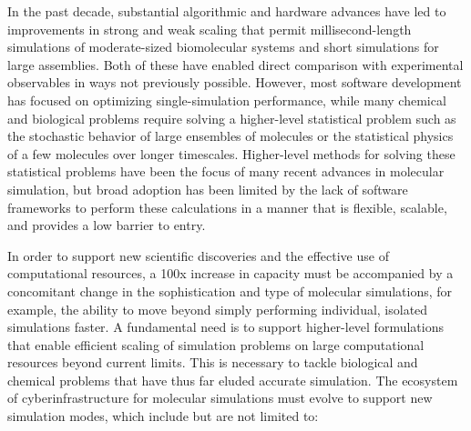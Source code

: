 \documentclass[10pt,letterpaper,draft]{article}
\begin{document}
In the past decade, substantial algorithmic and hardware advances have led to
improvements in strong and weak scaling that permit millisecond-length
simulations of moderate-sized biomolecular systems and short simulations for
large assemblies.  Both of these have enabled direct comparison with
experimental observables in ways not previously possible.  However, most
software development has focused on optimizing single-simulation performance,
while many chemical and biological problems require solving a higher-level
statistical problem such as the stochastic behavior of large ensembles of
molecules or the statistical physics of a few molecules over longer timescales.
Higher-level methods for solving these statistical problems have been the focus
of many recent advances in molecular simulation, but broad adoption has been
limited by the lack of software frameworks to perform these calculations in a
manner that is flexible, scalable, and provides a low barrier to entry.

In order to support new scientific discoveries and the effective use of
computational resources, a 100x increase in capacity must be accompanied by a
concomitant change in the sophistication and type of molecular simulations, for
example, the ability to move beyond simply performing individual, isolated
simulations faster. A fundamental need is to support higher-level formulations
that enable efficient scaling of simulation problems on large computational
resources beyond current limits.  This is necessary to tackle biological and
chemical problems that have thus far eluded accurate simulation.  The ecosystem
of cyberinfrastructure for molecular simulations must evolve to support new
simulation modes, which include but are not limited to:
\end{document}
